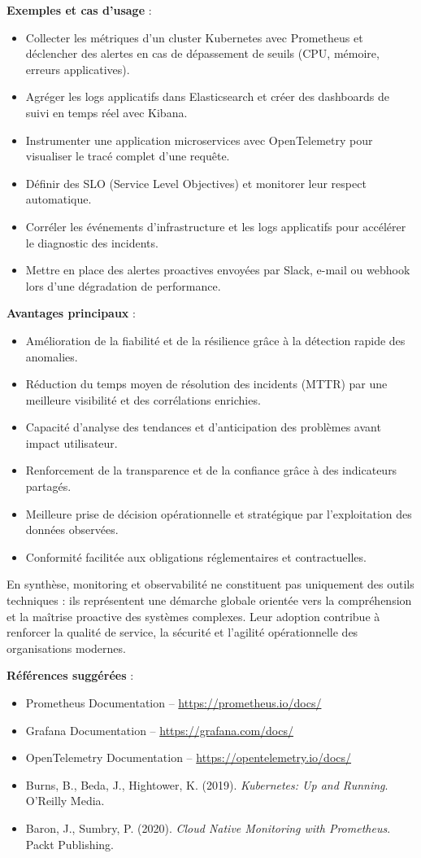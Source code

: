 \textbf{Exemples et cas d’usage} :
\begin{itemize}
	\item Collecter les métriques d’un cluster Kubernetes avec Prometheus et déclencher des alertes en cas de dépassement de seuils (CPU, mémoire, erreurs applicatives).
	\item Agréger les logs applicatifs dans Elasticsearch et créer des dashboards de suivi en temps réel avec Kibana.
	\item Instrumenter une application microservices avec OpenTelemetry pour visualiser le tracé complet d’une requête.
	\item Définir des SLO (Service Level Objectives) et monitorer leur respect automatique.
	\item Corréler les événements d’infrastructure et les logs applicatifs pour accélérer le diagnostic des incidents.
	\item Mettre en place des alertes proactives envoyées par Slack, e-mail ou webhook lors d’une dégradation de performance.
\end{itemize}

\textbf{Avantages principaux} :
\begin{itemize}
	\item Amélioration de la fiabilité et de la résilience grâce à la détection rapide des anomalies.
	\item Réduction du temps moyen de résolution des incidents (MTTR) par une meilleure visibilité et des corrélations enrichies.
	\item Capacité d’analyse des tendances et d’anticipation des problèmes avant impact utilisateur.
	\item Renforcement de la transparence et de la confiance grâce à des indicateurs partagés.
	\item Meilleure prise de décision opérationnelle et stratégique par l’exploitation des données observées.
	\item Conformité facilitée aux obligations réglementaires et contractuelles.
\end{itemize}

En synthèse, monitoring et observabilité ne constituent pas uniquement des outils techniques : ils représentent une démarche globale orientée vers la compréhension et la maîtrise proactive des systèmes complexes. Leur adoption contribue à renforcer la qualité de service, la sécurité et l’agilité opérationnelle des organisations modernes.

\textbf{Références suggérées} :
\begin{itemize}
	\item Prometheus Documentation – \url{https://prometheus.io/docs/}
	\item Grafana Documentation – \url{https://grafana.com/docs/}
	\item OpenTelemetry Documentation – \url{https://opentelemetry.io/docs/}
	\item Burns, B., Beda, J., Hightower, K. (2019). \textit{Kubernetes: Up and Running}. O’Reilly Media.
	\item Baron, J., Sumbry, P. (2020). \textit{Cloud Native Monitoring with Prometheus}. Packt Publishing.
\end{itemize}

